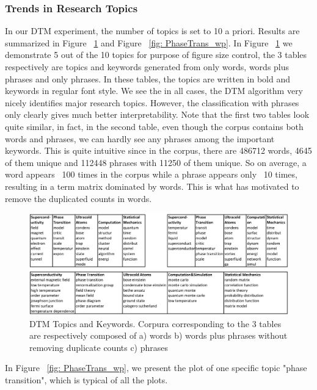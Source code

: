 \documentclass[DIV=calc, paper=letter, fontsize=10pt, twocolumn]{scrartcl}	 %
\begin{document}
\subsubsection*{Trends in Research Topics}
In our DTM experiment, the number of topics is set to 10 a priori. Results are summarized in Figure ~\ref{fig: DTM_table_unweight} and Figure ~\ref{fig: PhaseTrans_wp}.\newline \newline
In Figure ~\ref{fig: DTM_table_unweight} we demonstrate 5 out of the 10 topics for purpose of figure size control, the 3 tables respectively are topics and keywords generated from only words, words plus phrases and only phrases. In these tables, the topics are written in bold and keywords in regular font style. We see the in all cases, the DTM algorithm very nicely identifies major research topics. However, the classification with phrases only clearly gives much better interpretability. Note that the first two tables look quite similar, in fact, in the second table, even though the corpus contains both words and phrases, we can hardly see any phrases among the important keywords. This is quite intuitive since in the corpus, there are 486712 words, 4645 of them unique and 112448 phrases with 11250 of them unique. So on average, a word appears ~100 times in the corpus while a phrase appears only ~10 times, resulting in a term matrix dominated by words. This is what has motivated to remove the duplicated counts in words.\newline \newline
\begin{figure}[!ht]
  \includegraphics[scale = 0.45]{dtm10_unweight.eps}
  \caption{DTM Topics and Keywords. \rm{ Corpura corresponding to the 3 tables are respectively composed of a) words b) words plus phrases without removing duplicate counts c) phrases}}
  \label{fig: DTM_table_unweight}
\end{figure}
In Figure ~\ref{fig: PhaseTrans_wp}, we present the plot of one specific topic "phase transition", which is typical of all the plots.
\end{document}
